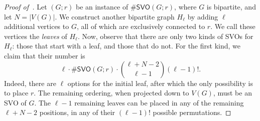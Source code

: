 \documentclass[11pt]{amsart}
\begin{document}
\begin{proof}[Proof of~]
    

    Let $(G; r)$ be an instance of $\#\mathsf{SVO}(G; r)$, where $G$ is bipartite, and let $N = |V(G)|$. We construct another bipartite graph $H_\ell$ by adding $\ell$ additional vertices to $G$, all of which are exclusively connected to $r$. We call these vertices the \emph{leaves} of $H_\ell$.
    Now, observe that there are only two kinds of SVOs for $H_\ell$: those that start with a leaf, and those that do not.
    For the first kind, we claim that their number is
    \[
    \ell \cdot \# \mathsf{SVO}(G; r) \cdot \binom{\ell+N-2}{\ell-1} (\ell-1)!.
    \]
    Indeed, there are $\ell$ options for the initial leaf, after which the only possibility is to place $r$. The remaining ordering, when projected down to $V(G)$, must be an SVO of $G$. The $\ell-1$ remaining leaves can be placed in any of the remaining $\ell+N-2$ positions, in any of their $(\ell-1)!$ possible permutations.


\end{proof}
\end{document}

